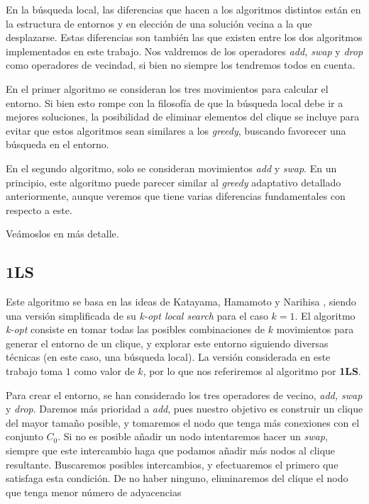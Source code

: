 En la búsqueda local, las diferencias que hacen a los algoritmos distintos están en la estructura
de entornos y en elección de una solución vecina a la que desplazarse. Estas diferencias son
también las que existen entre los dos algoritmos implementados en este trabajo. Nos valdremos
de los operadores \textit{add, swap} y \textit{drop} como operadores de vecindad, si bien no
siempre los tendremos todos en cuenta.

En el primer algoritmo se consideran los tres movimientos para calcular el entorno.
Si bien esto rompe con la filosofía de que la búsqueda local debe ir a mejores soluciones,
la posibilidad de eliminar elementos del clique se incluye para evitar que estos algoritmos
sean similares a los \textit{greedy}, buscando favorecer una búsqueda en el entorno.

En el segundo algoritmo, solo se consideran movimientos \textit{add} y \textit{swap}.
En un principio, este algoritmo puede parecer similar al \textit{greedy} adaptativo
detallado anteriormente, aunque veremos que tiene varias diferencias fundamentales
con respecto a este.

Veámoslos en más detalle.

\subsection{1LS}\label{1ls}

Este algoritmo se basa en las ideas de Katayama, Hamamoto y Narihisa \citep{katayama:2005},
siendo una versión simplificada de su \textit{k-opt local search} para el caso $k = 1$.
El algoritmo \textit{k-opt} consiste en tomar todas las posibles combinaciones de $k$
movimientos para generar el entorno de un clique, y explorar este entorno siguiendo
diversas técnicas (en este caso, una búsqueda local). La versión considerada en este
trabajo toma $1$ como valor de $k$, por lo que nos referiremos al algoritmo por \textbf{1LS}.

Para crear el entorno, se han considerado los tres operadores de vecino, \textit{add, swap}
y \textit{drop}. Daremos más prioridad a \textit{add}, pues nuestro objetivo es construir
un clique del mayor tamaño posible, y tomaremos el nodo que tenga más conexiones con el
conjunto $C_0$. Si no es posible añadir un nodo intentaremos hacer un \textit{swap}, siempre
que este intercambio haga que podamos añadir más nodos al clique resultante. Buscaremos
posibles intercambios, y efectuaremos el primero que satisfaga esta condición. De no haber
ninguno, eliminaremos del clique el nodo que tenga menor número de adyacencias

